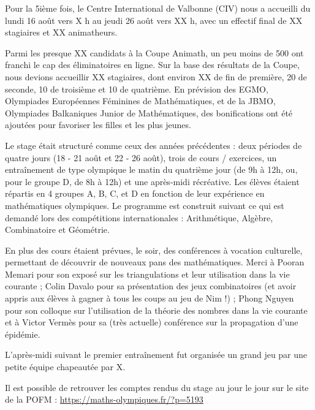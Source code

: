 
Pour la 5ième fois, le Centre International de Valbonne (CIV) nous a accueilli du lundi 16 août vers X h au jeudi 26 août vers XX h, avec un effectif final de XX stagiaires et XX animatheurs. 


Parmi les presque XX candidats à la Coupe Animath, un peu moins de 500 ont franchi le cap des éliminatoires en ligne. Sur la base des résultats de la Coupe, nous devions accueillir XX stagiaires, dont environ XX de fin de première, 20 de seconde, 10 de troisième et 10 de quatrième. En prévision des EGMO, Olympiades Européennes Féminines de Mathématiques,
et de la JBMO, Olympiades Balkaniques Junior de Mathématiques, 
des bonifications ont été ajoutées pour favoriser les filles et les plus jeunes.




Le stage était structuré comme ceux des années précédentes : deux périodes de quatre jours (18 - 21 août et 22 - 26 août), trois de cours / exercices, un entraînement %
de type olympique le matin du quatrième jour (de 9h à 12h, ou, pour le groupe D, de 8h à 12h) et une après-midi récréative. Les élèves étaient répartis en 4 groupes A, B, C, et D en fonction de leur expérience en mathématiques olympiques.
Le programme est construit suivant ce qui est demandé lors des compétitions internationales : Arithmétique, Algèbre, Combinatoire et Géométrie.



En plus des cours étaient prévues, le soir, des conférences à vocation culturelle, permettant de découvrir de nouveaux pans des mathématiques. Merci à Pooran Memari pour son exposé sur les triangulations et leur utilisation dans la vie courante ; Colin Davalo pour sa présentation des jeux combinatoires (et avoir appris aux élèves à gagner à tous les coups au jeu de Nim !) ; Phong Nguyen pour son colloque sur l'utilisation de la théorie des nombres dans la vie courante et à  Victor Vermès pour sa (très actuelle) conférence sur la propagation d'une épidémie.



L'après-midi suivant le premier entraînement fut organisée un grand jeu par une petite équipe chapeautée par X. %


Il est possible de retrouver les comptes rendus du stage au jour le jour sur le site de la POFM : \url{https://maths-olympiques.fr/?p=5193}

\vfill
\pagebreak
